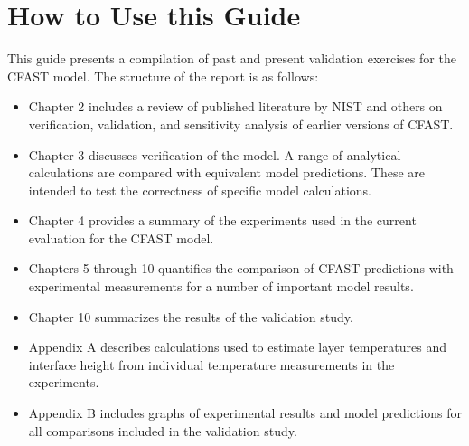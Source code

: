 \section{How to Use this Guide}

This guide presents a compilation of past and present validation exercises for the CFAST model.  The structure of the report is as follows:

\begin{itemize}
\item Chapter 2 includes a review of published literature by NIST and others on verification, validation, and sensitivity analysis of earlier versions of CFAST.
\item Chapter 3 discusses verification of the model.  A range of analytical calculations are compared with equivalent model predictions. These are intended to test the correctness of specific model calculations.
\item Chapter 4 provides a summary of the experiments used in the current evaluation for the CFAST model.
\item Chapters 5 through 10 quantifies the comparison of CFAST predictions with experimental measurements for a number of important model results.
\item Chapter 10 summarizes the results of the validation study.
\item Appendix A describes calculations used to estimate layer temperatures and interface height from individual temperature measurements in the experiments.
\item Appendix B includes graphs of experimental results and model predictions for all comparisons included in the validation study.
\end{itemize}


